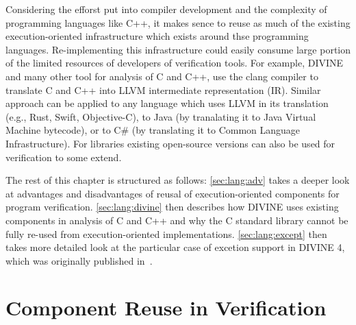 Considering the efforst put into compiler development and the complexity of
programming languages like C++, it makes sence to reuse as much of the existing
execution-oriented infrastructure which exists around thse programming
languages.
Re-implementing this infrastructure could easily consume large portion of the
limited resources of developers of verification tools.
For example, DIVINE and many other tool for analysis of C and C++, use the
clang compiler to translate C and C++ into LLVM intermediate representation
(IR).
Similar approach can be applied to any language which uses LLVM in its
translation (e.g., Rust, Swift, Objective-C), to Java (by tranalating it to
Java Virtual Machine bytecode), or to C\# (by translating it to Common Language
Infrastructure).
For libraries existing open-source versions can also be used for verification to some extend.

The rest of this chapter is structured as follows: \autoref{sec:lang:adv} takes a deeper look at advantages and disadvantages of reusal of execution-oriented components for program verification.
\autoref{sec:lang:divine} then describes how DIVINE uses existing components in analysis of C and C++ and why the C standard library cannot be fully re-used from execution-oriented implementations.
\autoref{sec:lang:except} then takes more detailed look at the particular case of excetion support in DIVINE 4, which was originally published in~\cite{SRB2017}.


\section{Component Reuse in Verification}\label{sec:lang:adv}

